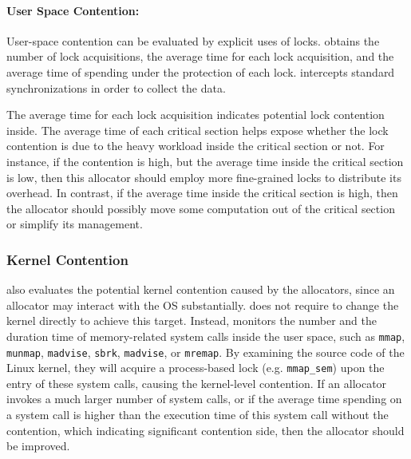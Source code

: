 \paragraph{User Space Contention:} User-space contention can be evaluated by explicit uses of locks. \MP{} obtains the number of lock acquisitions, the average time for each lock acquisition, and the average time of spending under the protection of each lock. \MP{} intercepts standard synchronizations in order to collect the data. 

The average time for each lock acquisition indicates potential lock contention inside. The average time of each critical section helps expose whether the lock contention is due to the heavy workload inside the critical section or not. For instance, if the contention is high, but the average time inside the critical section is low, then this allocator should employ more fine-grained locks to distribute its overhead. In contrast, if the average time inside the critical section is high, then the allocator should possibly move some computation out of the critical section or simplify its management. 



\subsubsection{Kernel Contention}
\MP{} also evaluates the potential kernel contention caused by the allocators, since an allocator may interact with the OS substantially. \MP{} does not require to change the kernel directly to achieve this target. Instead, \MP{} monitors the number and the duration time of memory-related system calls inside the user space, such as \texttt{mmap}, \texttt{munmap}, \texttt{madvise}, \texttt{sbrk}, \texttt{madvise}, or \texttt{mremap}. By examining the source code of the Linux kernel, they will acquire a process-based lock (e.g. \texttt{mmap\_sem}) upon the entry of these system calls, causing the kernel-level contention. If an allocator invokes a much larger number of system calls, or if the average time spending on a system call is higher than the execution time of this system call without the contention, which indicating significant contention side, then the allocator should be improved. 

